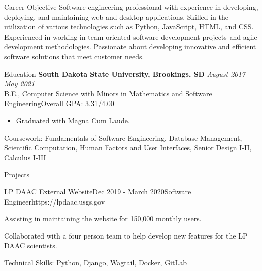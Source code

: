 \documentclass[11pt, a4paper]{resume}
\begin{document}
\begin{rSection}{Career Objective}
{\normalfont Software engineering professional with experience in developing, deploying, and maintaining web and desktop applications. Skilled in the utilization of various technologies such as Python, JavaScript, HTML, and CSS. Experienced in working in team-oriented software development projects and agile development methodologies. Passionate about developing innovative and efficient software solutions that meet customer needs.}
\end{rSection}


\begin{rSection}{Education}
{\bf South Dakota State University, Brookings, SD} \hfill {\normalfont \em August 2017 - May 2021} 
\\ {\normalfont B.E., Computer Science with Minors in Mathematics and Software Engineering}\hfill {\normalfont Overall GPA: 3.31/4.00 }
    \begin{itemize}
        \item \normalfont Graduated with Magna Cum Laude.
    \end{itemize}
    {Coursework: \normalfont Fundamentals of Software Engineering, Database Management, Scientific Computation, Human Factors and User Interfaces, Senior Design I-II, Calculus I-III}
\end{rSection}

\begin{rSection}{Projects}
\begin{rSubsection}{LP DAAC External Website}{\normalfont Dec 2019 - March 2020}{Software Engineer}{https://lpdaac.usgs.gov}{}
  \item{\normalfont Assisting in maintaining the website for 150,000 monthly users.}
  \item{\normalfont Collaborated with a four person team to help develop new features for the LP DAAC scientists.}
  \item{Technical Skills: \normalfont Python, Django, Wagtail, Docker, GitLab}
\end{rSubsection}

\end{rSection}

\end{document}
